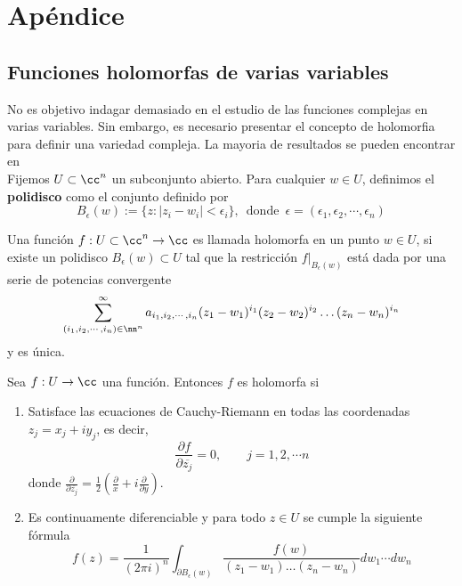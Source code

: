 \chapter*{Apéndice}

\setcounter{section}{0}
\renewcommand{\thesection}{A.\arabic{section}}

\section{Funciones holomorfas de varias variables}

No es objetivo indagar demasiado en el estudio de las funciones complejas en varias variables. Sin embargo, es necesario presentar el concepto de holomorfia para definir una variedad compleja. La mayoria de resultados se pueden encontrar en \parencite[Cap 1, Sec 1.1]{huybrechts2005complex}\\
Fijemos $U\subset\cc^n$ un subconjunto abierto. Para cualquier $w\in U$, definimos el \textbf{polidisco} como el conjunto definido por
\begin{equation*}
	B_\epsilon(w):=\{z: |z_i-w_i|<\epsilon_i\},\enspace \text{donde}\enspace \epsilon=(\epsilon_1,\epsilon_2,\cdots,\epsilon_n)
\end{equation*}

\begin{definition}\label{taylor}
	Una función $f:U\subset \cc^n\to\cc$ es llamada holomorfa en un punto $w\in U$, si existe un polidisco $B_\epsilon(w)\subset U$ tal que la restricción $f\left.\right|_{B_\epsilon(w)}$ está dada por una serie de potencias convergente \begin{equation*}
		\sum_{(i_1,i_2,\cdots,i_n)\in\nn^n}^{\infty}a_{i_1,i_2,\cdots,i_n}(z_1-w_1)^{i_1}(z_2-w_2)^{i_2}\dots(z_n-w_n)^{i_n}
	\end{equation*}
	y es única.
\end{definition}

\begin{remark} Sea $f:U\to\cc$ una función. Entonces $f$ es holomorfa si 
	\begin{enumerate}
		\item Satisface las ecuaciones de Cauchy-Riemann en todas las coordenadas $z_j=x_j+iy_j$, es decir,
		\begin{equation*}
			\frac{\partial f}{\partial \overline{z_j}}=0,\qquad j=1,2,\cdots n
		\end{equation*}
		donde $\frac{\partial}{\partial \overline{z_j}}=\frac{1}{2}(\frac{\partial}{x}+i\frac{\partial }{\partial y})$.
		
		\item Es continuamente diferenciable y para todo $z\in U$ se cumple la siguiente fórmula
		\begin{equation*}
			f(z)=\frac{1}{(2\pi i)^n}\int_{\partial B_\epsilon(w)}\frac{f(w)}{(z_1-w_1)\dots(z_n-w_n)}dw_1\cdots dw_n
		\end{equation*}
	\end{enumerate}
	
\end{remark}

